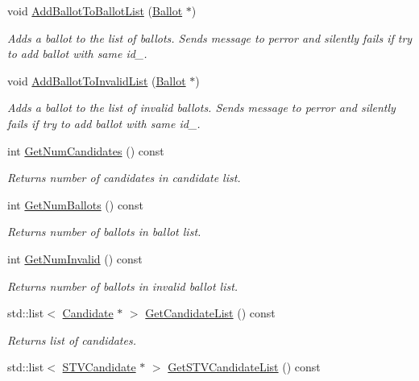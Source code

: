\begin{DoxyCompactItemize}
void \hyperlink{classVotingInfo_ae4b8b9a77642271760bce59a0411f900}{Add\+Ballot\+To\+Ballot\+List} (\hyperlink{classBallot}{Ballot} $\ast$)
\begin{DoxyCompactList}\small\item\em Adds a ballot to the list of ballots. Sends message to perror and silently fails if try to add ballot with same id\+\_\+. \end{DoxyCompactList}\item 
void \hyperlink{classVotingInfo_abeaad75b449c2dee8379d1f67768f963}{Add\+Ballot\+To\+Invalid\+List} (\hyperlink{classBallot}{Ballot} $\ast$)
\begin{DoxyCompactList}\small\item\em Adds a ballot to the list of invalid ballots. Sends message to perror and silently fails if try to add ballot with same id\+\_\+. \end{DoxyCompactList}\item 
int \hyperlink{classVotingInfo_add7749e53650135da703aa7b816598f5}{Get\+Num\+Candidates} () const
\begin{DoxyCompactList}\small\item\em Returns number of candidates in candidate list. \end{DoxyCompactList}\item 
int \hyperlink{classVotingInfo_af84ccfdfbdf95bc33f959d8b82e27d8c}{Get\+Num\+Ballots} () const
\begin{DoxyCompactList}\small\item\em Returns number of ballots in ballot list. \end{DoxyCompactList}\item 
int \hyperlink{classVotingInfo_ab228e2f9415e099d0d38c2194309e3c6}{Get\+Num\+Invalid} () const
\begin{DoxyCompactList}\small\item\em Returns number of ballots in invalid ballot list. \end{DoxyCompactList}\item 
std\+::list$<$ \hyperlink{classCandidate}{Candidate} $\ast$ $>$ \hyperlink{classVotingInfo_ad64e934ebd73e4be9e89458e0a304030}{Get\+Candidate\+List} () const
\begin{DoxyCompactList}\small\item\em Returns list of candidates. \end{DoxyCompactList}\item 
std\+::list$<$ \hyperlink{classSTVCandidate}{S\+T\+V\+Candidate} $\ast$ $>$ \hyperlink{classVotingInfo_a16f743613daad52be36a92226001e5dd}{Get\+S\+T\+V\+Candidate\+List} () const

\end{DoxyCompactItemize}
